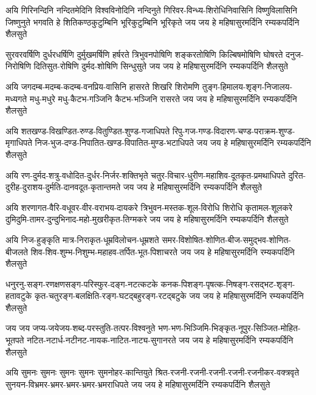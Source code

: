 
\fourlineindentedshloka
{अयि गिरिनन्दिनि नन्दितमेदिनि विश्वविनोदिनि नन्दिनुते}
{गिरिवर-विन्ध्य-शिरोधिनिवासिनि विष्णुविलासिनि जिष्णुनुते}
{भगवति हे शितिकण्ठकुटुम्बिनि भूरिकुटुम्बिनि भूरिकृते}
{जय जय हे महिषासुरमर्दिनि रम्यकपर्दिनि शैलसुते}

\fourlineindentedshloka
{सुरवरवर्षिणि दुर्धरधर्षिणि दुर्मुखमर्षिणि हर्षरते}
{त्रिभुवनपोषिणि शङ्करतोषिणि किल्बिषमोषिणि घोषरते}
{दनुज-निरोषिणि दितिसुत-रोषिणि दुर्मद-शोषिणि सिन्धुसुते}
{जय जय हे महिषासुरमर्दिनि रम्यकपर्दिनि शैलसुते}

\fourlineindentedshloka
{अयि जगदम्ब-मदम्ब-कदम्ब-वनप्रिय-वासिनि हासरते}
{शिखरि शिरोमणि तुङ्ग-हिमालय-शृङ्ग-निजालय-मध्यगते}
{मधु-मधुरे मधु-कैटभ-गञ्जिनि कैटभ-भञ्जिनि रासरते}
{जय जय हे महिषासुरमर्दिनि रम्यकपर्दिनि शैलसुते}

\fourlineindentedshloka
{अयि शतखण्ड-विखण्डित-रुण्ड-वितुण्डित-शुण्ड-गजाधिपते}
{रिपु-गज-गण्ड-विदारण-चण्ड-पराक्रम-शुण्ड-मृगाधिपते}
{निज-भुज-दण्ड-निपातित-खण्ड-विपातित-मुण्ड-भटाधिपते}
{जय जय हे महिषासुरमर्दिनि रम्यकपर्दिनि शैलसुते}

\fourlineindentedshloka
{अयि रण-दुर्मद-शत्रु-वधोदित-दुर्धर-निर्जर-शक्तिभृते}
{चतुर-विचार-धुरीण-महाशिव-दूतकृत-प्रमथाधिपते}
{दुरित-दुरीह-दुराशय-दुर्मति-दानवदूत-कृतान्तमते}
{जय जय हे महिषासुरमर्दिनि रम्यकपर्दिनि शैलसुते}

\fourlineindentedshloka
{अयि शरणागत-वैरि-वधूवर-वीर-वराभय-दायकरे}
{त्रिभुवन-मस्तक-शूल-विरोधि शिरोधि कृतामल-शूलकरे}
{दुमिदुमि-तामर-दुन्दुभिनाद-महो-मुखरीकृत-तिग्मकरे}
{जय जय हे महिषासुरमर्दिनि रम्यकपर्दिनि शैलसुते}

\fourlineindentedshloka
{अयि निज-हुङ्कृति मात्र-निराकृत-धूम्रविलोचन-धूम्रशते}
{समर-विशोषित-शोणित-बीज-समुद्भव-शोणित-बीजलते}
{शिव-शिव-शुम्भ-निशुम्भ-महाहव-तर्पित-भूत-पिशाचरते}
{जय जय हे महिषासुरमर्दिनि रम्यकपर्दिनि शैलसुते}

\fourlineindentedshloka
{धनुरनु-सङ्ग-रणक्षणसङ्ग-परिस्फुर-दङ्ग-नटत्कटके}
{कनक-पिशङ्ग-पृषत्क-निषङ्ग-रसद्भट-शृङ्ग-हतावटुके}
{कृत-चतुरङ्ग-बलक्षिति-रङ्ग-घटद्बहुरङ्ग-रटद्बटुके}
{जय जय हे महिषासुरमर्दिनि रम्यकपर्दिनि शैलसुते}

\fourlineindentedshloka
{जय जय जप्य-जयेजय-शब्द-परस्तुति-तत्पर-विश्वनुते}
{भण-भण-भिञ्जिमि-भिङ्कृत-नूपुर-सिञ्जित-मोहित-भूतपते}
{नटित-नटार्ध-नटीनट-नायक-नाटित-नाट्य-सुगानरते}
{जय जय हे महिषासुरमर्दिनि रम्यकपर्दिनि शैलसुते}

\fourlineindentedshloka
{अयि सुमनः सुमनः सुमनः सुमनः सुमनोहर-कान्तियुते}
{श्रित-रजनी-रजनी-रजनी-रजनी-रजनीकर-वक्त्रवृते}
{सुनयन-विभ्रमर-भ्रमर-भ्रमर-भ्रमर-भ्रमराधिपते}
{जय जय हे महिषासुरमर्दिनि रम्यकपर्दिनि शैलसुते}

